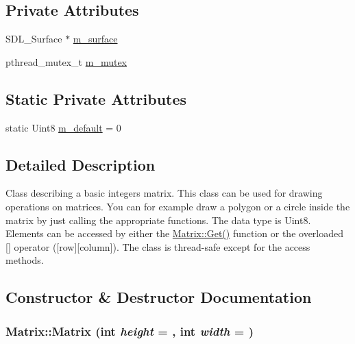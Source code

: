 \subsection*{Private Attributes}
\begin{DoxyCompactItemize}
\item 
SDL\_\-Surface $\ast$ \hyperlink{classMatrix_a76ecc20ed053f699bcf299958be9f4a1}{m\_\-surface}
\item 
pthread\_\-mutex\_\-t \hyperlink{classMatrix_aba01078d3f7abfceae9f6ce1913bbdc3}{m\_\-mutex}
\end{DoxyCompactItemize}
\subsection*{Static Private Attributes}
\begin{DoxyCompactItemize}
\item 
static Uint8 \hyperlink{classMatrix_a128eca9782b86bae0eed3d1d0967249e}{m\_\-default} = 0
\end{DoxyCompactItemize}


\subsection{Detailed Description}
Class describing a basic integers matrix. This class can be used for drawing operations on matrices. You can for example draw a polygon or a circle inside the matrix by just calling the appropriate functions. The data type is Uint8. Elements can be accessed by either the \hyperlink{classMatrix_a06fc8df480cd88daf69eaa05867cb7bd}{Matrix::Get()} function or the overloaded \mbox{[}\mbox{]} operator (\mbox{[}row\mbox{]}\mbox{[}column\mbox{]}). The class is thread-\/safe except for the access methods. 

\subsection{Constructor \& Destructor Documentation}
\hypertarget{classMatrix_a1cf5bd8134711df6f63e1dbef1912b86}{
\subsubsection[{Matrix}]{\setlength{\rightskip}{0pt plus 5cm}Matrix::Matrix (int {\em height} = {}, \/  int {\em width} = {})}}
\label{classMatrix_a1cf5bd8134711df6f63e1dbef1912b86}

